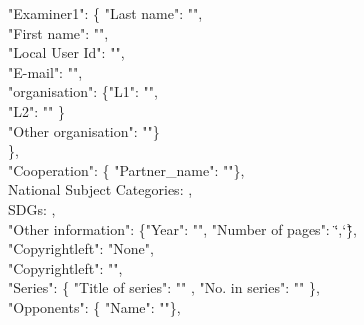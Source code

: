 {\begin{flushleft}
    \fi
    \ifx\@examinersLastname\@empty\relax
        \else
    "Examiner1": \{ "Last name": "\@examinersLastname",\\
    \ifx\@examinersFirstname\@empty\relax
    \else
    "First name": "\@examinersFirstname",\\
    \fi
    \ifx\@examinersKTHID\@empty\relax
    \else
    "Local User Id": "\@examinersKTHID",\\
    \fi
    \ifx\@examinersEmail\@empty\relax
    \else
    "E-mail": "\@examinersEmail",\\
    \fi
    \ifx\@examinersOrganization\@empty
    \ifx\@examinersSchool\@empty\relax
    \else
    "organisation": \{"L1": "\@examinersSchool",\\
    \ifx\@examinersDepartment\@empty\relax
    \else
    "L2": "\@examinersDepartment"
    \fi
    \}\\
    \fi
    \else
    "Other organisation": "\@examinersOrganization"\}\\
    \fi
    \},\\
    \fi
    \ifx\@hostcompany\@empty\relax
    \else
    "Cooperation": \{ "Partner\_name": "\@hostcompany"\},\\
    \fi
    \ifx\@nationalsubjectcategories\@empty\relax
    \else
    \textquotedbl\relax National Subject Categories\textquotedbl\relax: \textquotedbl\relax\@nationalsubjectcategories\textquotedbl\relax,\\
    \fi
    \ifx\@SDGs\@empty%
    \else
    \textquotedbl\relax SDGs\textquotedbl\relax:
    \textquotedbl\relax\@SDGs\textquotedbl\relax,\\
    \fi
    "Other information": \{"Year": "\the\year", "Number of pages": \char`\"\pageref{#1},\pageref{#2}\char`\"
    \},\\
    \ifx\@copyrightleft\@empty
    "Copyrightleft": "None",\\
    \else
    "Copyrightleft": "\@copyrightleft",\\
    \fi
    "Series": \{
    \ifx\@thesisSeries\@empty\relax
        \else
        	"Title of series": "\@thesisSeries"
        	\ifx\@thesisSeriesNumber\@empty\relax
            \else
            , "No. in series": "\@thesisSeriesNumber"
             \fi
    \fi
    \},\\
        \ifx\@opponentsNamea\@empty\relax
        \else
    "Opponents": \{ "Name": "\@opponentsNames"\},\\

\end{flushleft}}
